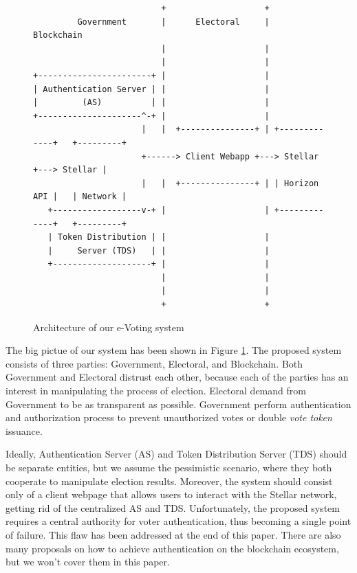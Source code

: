 \documentclass[runningheads]{llncs}
\begin{document}
\begin{figure}
\begin{verbatim}
                          +                    +
         Government       |      Electoral     |      Blockchain
                          |                    |
                          |                    |
+-----------------------+ |                    |
| Authentication Server | |                    |
|         (AS)          | |                    |
+---------------------^-+ |                    |
                      |   |  +---------------+ | +-------------+   +---------+
                      +------> Client Webapp +---> Stellar     +---> Stellar |
                      |   |  +---------------+ | | Horizon API |   | Network |
   +------------------v-+ |                    | +-------------+   +---------+
   | Token Distribution | |                    |
   |     Server (TDS)   | |                    |
   +--------------------+ |                    |
                          |                    |
                          |                    |
                          +                    +
\end{verbatim}
\caption{Architecture of our e-Voting system}
\label{fig:ascii-box}
\end{figure} 
\fi

The big pictue of our system has been shown in Figure \ref{fig:ascii-box}.
The proposed system consists of three parties: Government, Electoral, and Blockchain. Both Government and Electoral distrust each other, because each of the parties has an interest in manipulating the process of election. Electoral demand from Government to be as transparent as possible. Government perform authentication and authorization process to prevent unauthorized votes or double \textit{vote token} issuance.

Ideally, Authentication Server (AS) and Token Distribution Server (TDS) should be separate entities, but we assume the pessimistic scenario, where they both cooperate to manipulate election results. Moreover, the system should consist only of a client webpage that allows users to interact with the Stellar network, getting rid of the centralized AS and TDS. Unfortunately, the proposed system requires a central authority for voter authentication, thus becoming a single point of failure. This flaw has been addressed at the end of this paper. There are also many proposals on how to achieve authentication on the blockchain ecosystem, but we won't cover them in this paper.
\end{document}
